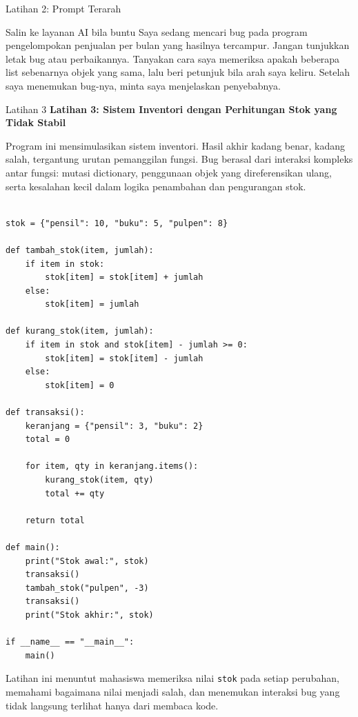 \documentclass[aspectratio=169, table]{beamer}
\begin{document}
\begin{frame}{Latihan 2: Prompt Terarah}
\begin{block}{Salin ke layanan AI bila buntu}
\small Saya sedang mencari bug pada program pengelompokan penjualan per bulan yang hasilnya tercampur. Jangan tunjukkan letak bug atau perbaikannya. Tanyakan cara saya memeriksa apakah beberapa list sebenarnya objek yang sama, lalu beri petunjuk bila arah saya keliru. Setelah saya menemukan bug-nya, minta saya menjelaskan penyebabnya.
\end{block}
\end{frame}

\begin{frame}[fragile,allowframebreaks=0.8]{Latihan 3}
\footnotesize
\textbf{Latihan 3: Sistem Inventori dengan Perhitungan Stok yang Tidak Stabil}\par\medskip
Program ini mensimulasikan sistem inventori. Hasil akhir kadang benar, kadang salah, tergantung urutan pemanggilan fungsi. Bug berasal dari interaksi kompleks antar fungsi: mutasi dictionary, penggunaan objek yang direferensikan ulang, serta kesalahan kecil dalam logika penambahan dan pengurangan stok.

\begin{lstlisting}[style=PythonStyle, breaklines=true]

stok = {"pensil": 10, "buku": 5, "pulpen": 8}

def tambah_stok(item, jumlah):
    if item in stok:
        stok[item] = stok[item] + jumlah    
    else:
        stok[item] = jumlah

def kurang_stok(item, jumlah):
    if item in stok and stok[item] - jumlah >= 0:
        stok[item] = stok[item] - jumlah
    else:
        stok[item] = 0     

def transaksi():
    keranjang = {"pensil": 3, "buku": 2}
    total = 0

    for item, qty in keranjang.items():
        kurang_stok(item, qty)
        total += qty

    return total

def main():
    print("Stok awal:", stok)
    transaksi()
    tambah_stok("pulpen", -3)   
    transaksi()
    print("Stok akhir:", stok)

if __name__ == "__main__":
    main()
\end{lstlisting}

Latihan ini menuntut mahasiswa memeriksa nilai \texttt{stok} pada setiap perubahan, memahami bagaimana nilai menjadi salah, dan menemukan interaksi bug yang tidak langsung terlihat hanya dari membaca kode.
\end{frame}
\end{document}
